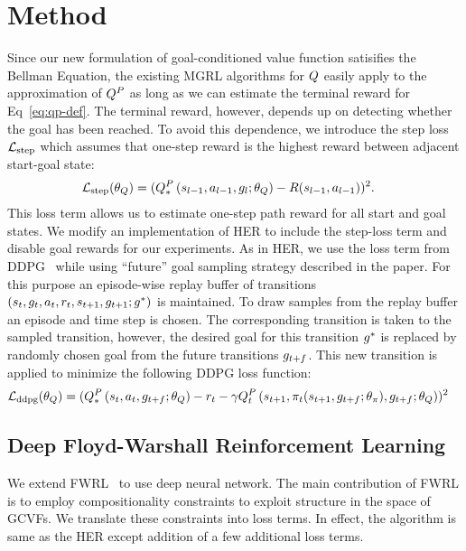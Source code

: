 \section{Method}
Since our new formulation of goal-conditioned value function satisifies the
Bellman Equation, the existing MGRL algorithms for $\fw$ easily apply to the
approximation of $\fw^P$ as long as we can estimate the terminal reward for
Eq~\eqref{eq:qp-def}. The terminal reward, however, depends up on detecting
whether the goal has been reached. To avoid this dependence, we introduce the
step loss $\LossStep$ which assumes that one-step reward is the highest reward between
adjacent start-goal state:
%
\begin{align}
      \LossStep(\param_\fw) &= (\fwargs{\state_{l-1}}{\act_{l-1}}{\goal_{l};\param_\fw}{*}{P} - \Rew(\state_{l-1}, \act_{l-1}))^2.
\end{align}
%
This loss term allows us to estimate one-step path reward for all start and goal
states.
We modify an implementation of HER to include the step-loss term and disable goal
rewards for our experiments.
As in HER, we use the loss term from DDPG~\cite{lillicrap2015continuous} while
using ``future'' goal sampling strategy described in the paper.
For this purpose an episode-wise replay buffer of transitions $(\state_t,
\goal_t, \act_t, \rew_t, \state_{t+1}, \goal_{t+1}; \goal^*)$ is maintained. To draw samples
from the replay buffer an episode and time step is chosen. The corresponding
transition is taken to the sampled transition, however, the desired goal for
this transition $\goal^*$ is replaced by randomly chosen goal from the future
transitions $\goal_{t+f}$. This new transition is applied to minimize the
following DDPG loss function:
%
\begin{align}
  \LossDDPG(\param_\fw) &= (\fwargs{\state_{t}}{\act_{t}}{\goal_{t+f}; \param_\fw}{*}{P} -
      \rew_t - \discount\fwargs{\state_{t+1}}{\policy_t(\state_{t+1}, \goal_{t+f};\param_\policy)}{\goal_{t+f};\param_\fw}{t}{P})^2
\end{align}
%

\subsection{Deep Floyd-Warshall Reinforcement Learning}

We extend FWRL~\citep{dhiman2018floydwarshall} to use deep neural network.
The main contribution of FWRL is to employ compositionality constraints to
exploit structure in the space of GCVFs.
We translate these constraints into loss terms.
In effect, the algorithm is same as the HER except
addition of a few additional loss terms.


